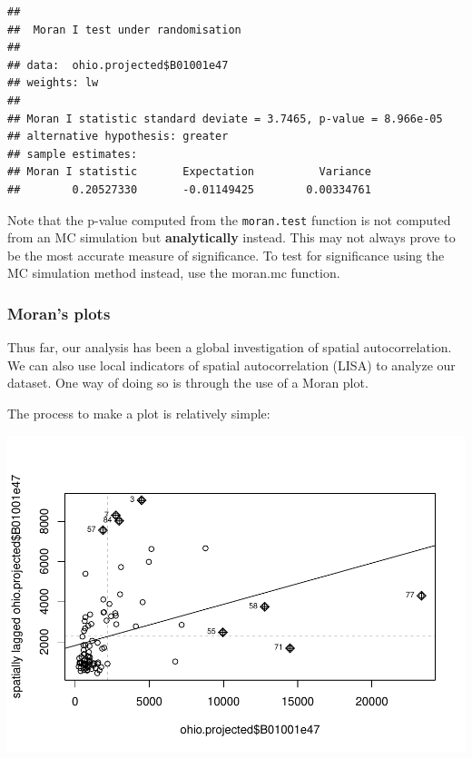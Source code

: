 \documentclass[]{article}
\newenvironment{Shaded}{\begin{snugshade}}{\end{snugshade}}
\newcommand{\AttributeTok}[1]{\textcolor[rgb]{0.13,0.29,0.53}{#1}}
\newcommand{\CommentTok}[1]{\textcolor[rgb]{0.56,0.35,0.01}{\textit{#1}}}
\newcommand{\ConstantTok}[1]{\textcolor[rgb]{0.56,0.35,0.01}{#1}}
\newcommand{\FunctionTok}[1]{\textcolor[rgb]{0.13,0.29,0.53}{\textbf{#1}}}
\newcommand{\NormalTok}[1]{#1}
\newcommand{\SpecialCharTok}[1]{\textcolor[rgb]{0.81,0.36,0.00}{\textbf{#1}}}
\begin{document}
\begin{verbatim}
## 
##  Moran I test under randomisation
## 
## data:  ohio.projected$B01001e47  
## weights: lw    
## 
## Moran I statistic standard deviate = 3.7465, p-value = 8.966e-05
## alternative hypothesis: greater
## sample estimates:
## Moran I statistic       Expectation          Variance 
##        0.20527330       -0.01149425        0.00334761
\end{verbatim}

Note that the p-value computed from the \texttt{moran.test} function is
not computed from an MC simulation but \textbf{analytically} instead.
This may not always prove to be the most accurate measure of
significance. To test for significance using the MC simulation method
instead, use the moran.mc function.

\subsubsection{Moran's plots}\label{morans-plots}

Thus far, our analysis has been a global investigation of spatial
autocorrelation. We can also use local indicators of spatial
autocorrelation (LISA) to analyze our dataset. One way of doing so is
through the use of a Moran plot.

The process to make a plot is relatively simple:

\begin{Shaded}
\end{Shaded}

\includegraphics{lab03_files/figure-latex/moranplot-1.pdf}
\end{document}
